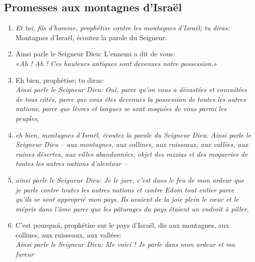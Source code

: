 \subsection*{Promesses aux montagnes d'Israël}
\begin{enumerate}[leftmargin=\psleftmargin, labelsep = \pslabelsep, label={\arabic*}, font=\color{\pscolor}\small\textsuperscript, parsep=0em, itemsep=0em, topsep=0em ]
  \item {}\textit{Et toi, fils d’homme, prophétise contre les montagnes d’Israël; \brk
          tu diras:} \\
        Montagnes d’Israël, écoutez la parole du Seigneur.
  \item {}Ainsi parle le Seigneur Dieu: \brk
        L’ennemi a dit de vous: \\
        «\textit{Ah ! Ah ! Ces hauteurs antiques sont devenues notre possession.}»
  \item {}Eh bien, prophétise;\brk
        tu diras: \\
        \textit{Ainsi parle le Seigneur Dieu: \brk
          Oui, parce qu’on vous a dévastées et convoitées de tous côtés, \brk
          parce que vous êtes devenues la possession de toutes les autres nations, \brk
          parce que lèvres et langues se sont moquées de vous parmi les peuples,}
  \item {}\textit{eh bien, montagnes d’Israël, écoutez la parole du Seigneur Dieu: \brk
          Ainsi parle le Seigneur Dieu – aux montagnes, aux collines, aux ruisseaux, \brk
          aux vallées, aux ruines désertes, aux villes abandonnées, \brk
          objet des razzias et des moqueries de toutes les autres nations d’alentour –}
  \item  {}\textit{ainsi parle le Seigneur Dieu: \brk
          Je le jure, c’est dans le feu de mon ardeur que je parle \brk
          contre toutes les autres nations et contre Edom tout entier \brk
          parce qu’ils se sont approprié mon pays. \brk
          Ils avaient de la joie plein le cœur et le mépris dans l’âme \brk
          parce que les pâturages du pays étaient un endroit à piller.} \verseSpace
  \item  {}C’est pourquoi, prophétise sur le pays d’Israël, \brk
        dis aux montagnes, aux collines, aux ruisseaux, aux vallées: \\
        \textit{Ainsi parle le Seigneur Dieu: \brk
          Me voici ! Je parle dans mon ardeur et ma fureur \brk
}
\end{enumerate}
